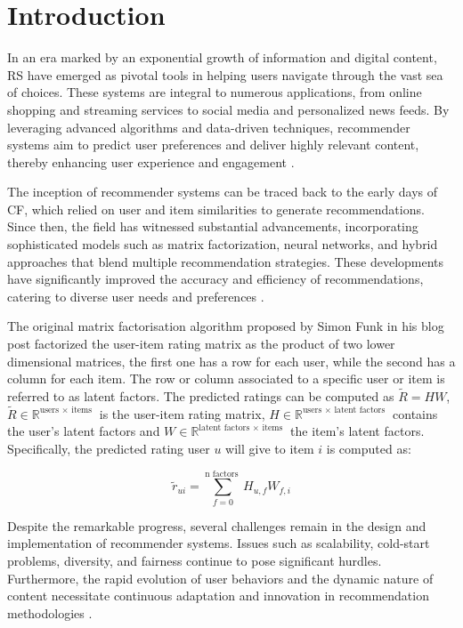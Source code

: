 \chapter{Introduction}\label{ch:introduction}

In an era marked by an exponential growth of information and digital content, \ac{RS} have emerged as pivotal tools in helping users navigate through the vast sea of choices. These systems are integral to numerous applications, from online shopping and streaming services to social media and personalized news feeds. By leveraging advanced algorithms and data-driven techniques, recommender systems aim to predict user preferences and deliver highly relevant content, thereby enhancing user experience and engagement \autocite{seneca}. 

The inception of recommender systems can be traced back to the early days of \ac{CF}, which relied on user and item similarities to generate recommendations. Since then, the field has witnessed substantial advancements, incorporating sophisticated models such as matrix factorization, neural networks, and hybrid approaches that blend multiple recommendation strategies. These developments have significantly improved the accuracy and efficiency of recommendations, catering to diverse user needs and preferences \autocite{taleb:2010}.

The original matrix factorisation algorithm proposed by Simon Funk in his blog post factorized the user-item rating matrix as the product of two lower dimensional matrices, the first one has a row for each user, while the second has a column for each item. The row or column associated to a specific user or item is referred to as latent factors. The predicted ratings can be computed as $\tilde{R}=H W$, $\tilde{R} \in \mathbb{R}^{\text {users } \times \text { items }}$ is the user-item rating matrix, $H \in \mathbb{R}^{\text {users } \times \text { latent factors }}$ contains the user's latent factors and  $W \in \mathbb{R}^{\text {latent factors } \times \text { items }}$ the item's latent factors. Specifically, the predicted rating user $u$ will give to item $i$ is computed as: 

\begin{equation}
    \tilde{r}_{u i}=\sum_{f=0}^{\mathrm{n} \text { factors }} H_{u, f} W_{f, i}
\end{equation}

Despite the remarkable progress, several challenges remain in the design and implementation of recommender systems. Issues such as scalability, cold-start problems, diversity, and fairness continue to pose significant hurdles. Furthermore, the rapid evolution of user behaviors and the dynamic nature of content necessitate continuous adaptation and innovation in recommendation methodologies \autocite{adams:2013}.

